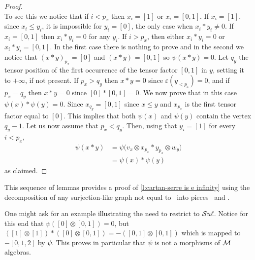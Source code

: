 \begin{proof}
\begin{equation*}
	\end{equation*}
	To see this we notice that if $i < p_x$ then $x_i = [1]$ or $x_i = [0,1]$.
	If $x_i = [1]$, since $x_i \leq y_i$, it is impossible for $y_i = [0]$, the only case when $x_i \ast y_i \neq 0$.
	If $x_i = [0,1]$ then $x_i \ast y_i = 0$ for any $y_i$.
	If $i > p_x$, then either $x_i \ast y_i = 0$ or $x_i \ast y_i = [0,1]$.
	In the first case there is nothing to prove and in the second we notice that $(x \ast y)_{p_x} = [0]$ and $(x \ast y)_{} = [0,1]$ so $\psi(x \ast y) = 0$.
	Let $q_y$ the tensor position of the first occurrence of the tensor factor $[0,1]$ in $y$, setting it to $+\infty$, if not present.
	If $p_x > q_y$ then $x \ast y = 0$ since $\varepsilon(y_{<p_x}) = 0$, and if $p_x = q_y$ then $x \ast y = 0$ since $[0] \ast [0,1] = 0$.
	We now prove that in this case $\psi(x) \ast \psi(y) = 0$.
	Since $x_{q_y} = [0,1]$ since $x \leq y$ and $x_{p_x}$ is the first tensor factor equal to $[0]$.
	This implies that both $\psi(x)$ and $\psi(y)$ contain the vertex $q_{y} - 1$.
	Let us now assume that $p_x < q_y$.
	Then, using that $y_i = [1]$ for every $i < p_x$,
	\begin{align*}
	\psi(x \ast y) & =
	\psi \big( v_x \otimes x_{p_x} \ast y_{p_x} \otimes w_y \big) \\ & =
	\psi(x) \ast \psi(y)
	\end{align*}
	as claimed.
\end{proof}

This sequence of lemmas provides a proof of \cref{l:cartan-serre is e infinity} using the decomposition of any surjection-like graph not equal to \counit \ into pieces \coproduct \ and \product.

\begin{remark}
	One might ask for an example illustrating the need to restrict to $\mathcal{S}u\ell$.
	Notice for this end that $\psi([0] \otimes [0,1]) = 0$, but $([1] \otimes [1]) \ast ([0] \otimes [0,1]) = -([0,1] \otimes [0,1])$ which is mapped to $-[0,1,2]$ by $\psi$.
	This proves in particular that $\psi$ is not a morphisms of $\mathcal{M}$ algebras.
\end{remark}